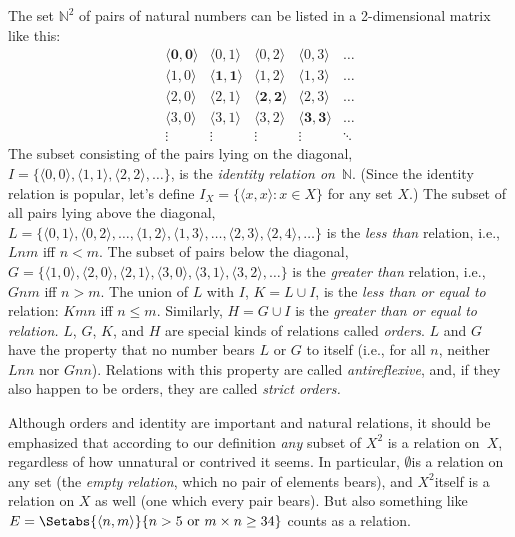 \documentclass[../../include/open-logic-section]{subfiles}
\begin{document}
\begin{ex}
The set $\mathbb{N}^{2}$ of
pairs of natural numbers can be listed in a 2-dimensional matrix like
this:
\[
\begin{array}{ccccc}
\mathbf{\langle 0,0 \rangle} & \langle 0,1 \rangle & 
  \langle 0,2 \rangle & \langle 0,3 \rangle & \ldots\\ 
\langle 1,0 \rangle & \mathbf{\langle 1,1 \rangle} & 
  \langle 1,2 \rangle & \langle 1,3 \rangle & \ldots\\ 
\langle 2,0 \rangle & \langle 2,1 \rangle & 
  \mathbf{\langle 2,2 \rangle} & \langle 2,3 \rangle & \ldots\\ 
\langle 3,0 \rangle & \langle 3,1 \rangle & \langle 3,2 \rangle &
  \mathbf{\langle 3,3 \rangle} & \ldots\\ 
\vdots & \vdots & \vdots & \vdots & \mathbf{\ddots}
\end{array}
\]
The subset consisting of the pairs lying on the diagonal, $I=\{\langle
0,0 \rangle, \langle 1,1 \rangle,\langle 2,2 \rangle,\ldots\}$, is the
\emph{identity relation on}~$\mathbb{N}$. (Since the identity
relation is popular, let's define $I_{X}=\{\langle x,x \rangle:x\in
X\}$ for any set $X$.) The subset of all pairs lying above the
diagonal, $L=\{\langle 0,1 \rangle,\langle 0,2 \rangle,\ldots,\langle
1,2 \rangle,\langle 1,3 \rangle,\ldots,\langle 2,3 \rangle,\langle 2,4
\rangle,\ldots\}$ is the \emph{less than} relation, i.e., $Lnm$ iff
$n<m$. The subset of pairs below the diagonal, $G=\{\langle 1,0
\rangle,\langle 2,0 \rangle,\langle 2,1 \rangle,\langle 3,0
\rangle,\langle 3,1 \rangle,\langle 3,2 \rangle,\ldots\}$ is the
\emph{greater than} relation, i.e., $Gnm$ iff $n>m$. The union of $L$
with $I$, $K=L\cup I$, is the \emph{less than or equal to} relation:
$Kmn$ iff $n\le m$. Similarly, $H=G\cup I$ is the \emph{greater than
  or equal to relation.} $L$, $G$, $K$, and $H$ are special kinds of
relations called \emph{orders}. $L$ and $G$ have the property that no
number bears $L$ or $G$ to itself (i.e., for all $n$, neither $Lnn$
nor $Gnn$). Relations with this property are called
\emph{antireflexive}, and, if they also happen to be orders, they are
called \emph{strict orders.}

Although orders and identity are important and natural relations, it
should be emphasized that according to our definition \emph{any}
subset of $X^{2}$ is a relation on~$X$, regardless of how unnatural or
contrived it seems. In particular, $\emptyset$is a relation on any set
(the \emph{empty relation}, which no pair of elements bears), and
$X^{2}$itself is a relation on $X$ as well (one which every pair
bears). But also something like $E=\Setabs{\langle
  n,m\rangle}{n>5\text{ or }m\times n\ge34}$ counts as a relation.
\end{ex}
\end{document}
